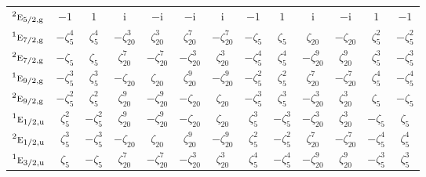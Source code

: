 \documentclass[10pt,a4paper]{article}
\numberwithin{equation}{section}
\newcommand{\irr}[1]{\text{\normalfont\scshape #1}}
\newcommand{\conjpair}[1]{{}^{#1}}
\newcommand{\ptag}[1]{\mathrm{#1}}
\newcommand{\iunit}{\mathrm{i}}
\newcommand{\rootunity}[1]{\zeta_{#1}}
\begin{document}
{\begin{longtable}{@{}lcccccccccccc@{}}
$\conjpair{2}\irr{e}_{5/2,\ptag{g}}$ & $-1$ & $1$ & $\iunit{}$ & $-\iunit{}$ & $-\iunit{}$ & $\iunit{}$ & $-1$ & $1$ & $\iunit{}$ & $-\iunit{}$ & $1$ & $-1$\\
$\conjpair{1}\irr{e}_{7/2,\ptag{g}}$ & $-\rootunity{5}^{4}$ & $\rootunity{5}^{4}$ & $-\rootunity{20}^{3}$ & $\rootunity{20}^{3}$ & $\rootunity{20}^{7}$ & $-\rootunity{20}^{7}$ & $-\rootunity{5}$ & $\rootunity{5}$ & $\rootunity{20}$ & $-\rootunity{20}$ & $\rootunity{5}^{2}$ & $-\rootunity{5}^{2}$\\
$\conjpair{2}\irr{e}_{7/2,\ptag{g}}$ & $-\rootunity{5}$ & $\rootunity{5}$ & $\rootunity{20}^{7}$ & $-\rootunity{20}^{7}$ & $-\rootunity{20}^{3}$ & $\rootunity{20}^{3}$ & $-\rootunity{5}^{4}$ & $\rootunity{5}^{4}$ & $-\rootunity{20}^{9}$ & $\rootunity{20}^{9}$ & $\rootunity{5}^{3}$ & $-\rootunity{5}^{3}$\\
$\conjpair{1}\irr{e}_{9/2,\ptag{g}}$ & $-\rootunity{5}^{3}$ & $\rootunity{5}^{3}$ & $-\rootunity{20}$ & $\rootunity{20}$ & $\rootunity{20}^{9}$ & $-\rootunity{20}^{9}$ & $-\rootunity{5}^{2}$ & $\rootunity{5}^{2}$ & $\rootunity{20}^{7}$ & $-\rootunity{20}^{7}$ & $\rootunity{5}^{4}$ & $-\rootunity{5}^{4}$\\
$\conjpair{2}\irr{e}_{9/2,\ptag{g}}$ & $-\rootunity{5}^{2}$ & $\rootunity{5}^{2}$ & $\rootunity{20}^{9}$ & $-\rootunity{20}^{9}$ & $-\rootunity{20}$ & $\rootunity{20}$ & $-\rootunity{5}^{3}$ & $\rootunity{5}^{3}$ & $-\rootunity{20}^{3}$ & $\rootunity{20}^{3}$ & $\rootunity{5}$ & $-\rootunity{5}$\\
$\conjpair{1}\irr{e}_{1/2,\ptag{u}}$ & $\rootunity{5}^{2}$ & $-\rootunity{5}^{2}$ & $\rootunity{20}^{9}$ & $-\rootunity{20}^{9}$ & $-\rootunity{20}$ & $\rootunity{20}$ & $\rootunity{5}^{3}$ & $-\rootunity{5}^{3}$ & $-\rootunity{20}^{3}$ & $\rootunity{20}^{3}$ & $-\rootunity{5}$ & $\rootunity{5}$\\
$\conjpair{2}\irr{e}_{1/2,\ptag{u}}$ & $\rootunity{5}^{3}$ & $-\rootunity{5}^{3}$ & $-\rootunity{20}$ & $\rootunity{20}$ & $\rootunity{20}^{9}$ & $-\rootunity{20}^{9}$ & $\rootunity{5}^{2}$ & $-\rootunity{5}^{2}$ & $\rootunity{20}^{7}$ & $-\rootunity{20}^{7}$ & $-\rootunity{5}^{4}$ & $\rootunity{5}^{4}$\\
$\conjpair{1}\irr{e}_{3/2,\ptag{u}}$ & $\rootunity{5}$ & $-\rootunity{5}$ & $\rootunity{20}^{7}$ & $-\rootunity{20}^{7}$ & $-\rootunity{20}^{3}$ & $\rootunity{20}^{3}$ & $\rootunity{5}^{4}$ & $-\rootunity{5}^{4}$ & $-\rootunity{20}^{9}$ & $\rootunity{20}^{9}$ & $-\rootunity{5}^{3}$ & $\rootunity{5}^{3}$\\

\end{longtable}}
\end{document}
